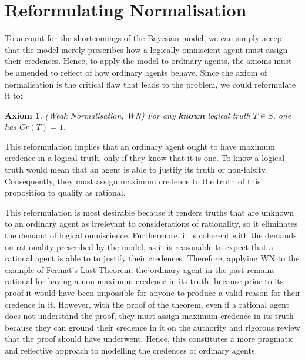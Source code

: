 \documentclass[12pt]{article}
\newtheorem{axiom}{Axiom}
\begin{document}
\section{Reformulating Normalisation}
To account for the shortcomings of the Bayesian model, we can simply accept that the model merely prescribes how a logically omniscient agent must assign their credences. Hence, to apply the model to ordinary agents, the axioms must be amended to reflect of how ordinary agents behave. Since the axiom of normalisation is the critical flaw that leads to the problem, we could reformulate it to:
\begin{axiom}
    (Weak Normalisation, WN) For any \textbf{known} logical truth $T\in S$, one has $Cr(T)=1$.
\end{axiom}
This reformulation implies that an ordinary agent ought to have maximum credence in a logical truth, only if they know that it is one.\autocite{sep} To know a logical truth would mean that an agent is able to justify its truth or non-falsity. Consequently, they must assign maximum credence to the truth of this proposition to qualify as rational.

This reformulation is most desirable because it renders truths that are unknown to an ordinary agent as irrelevant to considerations of rationality, so it eliminates the demand of logical omniscience. Furthermore, it is coherent with the demands on rationality prescribed by the model, as it is reasonable to expect that a rational agent is able to to justify their credences. Therefore, applying WN to the example of Fermat's Last Theorem, the ordinary agent in the past remains rational for having a non-maximum credence in its truth, because prior to its proof it would have been impossible for anyone to produce a valid reason for their credence in it. However, with the proof of the theorem, even if a rational agent does not understand the proof, they must assign maximum credence in its truth because they can ground their credence in it on the authority and rigorous review that the proof should have underwent. Hence, this constitutes a more pragmatic and reflective approach to modelling the credences of ordinary agents.
\end{document}
